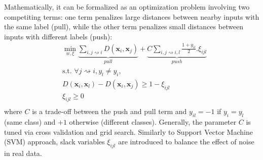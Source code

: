 %
Mathematically, it can be formalized as an optimization problem involving two competiting terms: one term penalizes large distances between nearby inputs with the same label (pull), while the other term penalizes small distances between inputs with different labels (push):
\begin{equation}
\begin{aligned}
&\displaystyle 		\min_{w,\xi}\underbrace{
	\sum\limits_{i,j \rightsquigarrow i}
	D(\textbf{x}_{i},\textbf{x}_{j})
}_{pull}
+
\underbrace{
	C\sum\limits_{i,j \rightsquigarrow i,l} \frac{1+y_{il}}{2}.\xi_{ijl}
}
_{push} \\
&\text{s.t.  } \forall j \rightsquigarrow i, y_l\neq y_i, \\
& D(\textbf{x}_{i},\textbf{x}_{l})-D(\textbf{x}_{i},\textbf{x}_{j}) \geq 1-\xi_{ijl} \\
& \xi_{ijl} \geq 0 \\
\label{eq:OptimizationProblem}
\end{aligned}
\end{equation}
\noindent where $C$ is a trade-off between the push and pull term and $y_{il}=-1$ if $y_i=y_l$ (same class) and $+1$ otherwise (different classes). Generally, the parameter $C$ is tuned via cross validation and grid search. Similarly to Support Vector Machine (SVM) approach, slack variables $\xi_{ijl}$ are introduced to balance the effect of noise in real data. 

